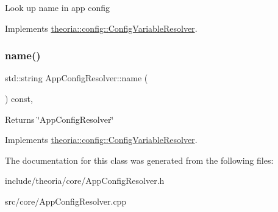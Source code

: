 Look up name in app config 

Implements \hyperlink{classtheoria_1_1config_1_1ConfigVariableResolver}{theoria\+::config\+::\+Config\+Variable\+Resolver}.

\mbox{\label{classtheoria_1_1core_1_1AppConfigResolver_ad7c8c08e622613c6505418774a71abda}} 
\subsubsection{\texorpdfstring{name()}{name()}}
{\footnotesize\ttfamily std\+::string App\+Config\+Resolver\+::name (\begin{DoxyParamCaption}{ }\end{DoxyParamCaption}) const\hspace{0.3cm}{\ttfamily [override]}, {\ttfamily [virtual]}}

Returns \char`\"{}\+App\+Config\+Resolver\char`\"{} 

Implements \hyperlink{classtheoria_1_1config_1_1ConfigVariableResolver_a026bda729faf988eaef334a45ec92303}{theoria\+::config\+::\+Config\+Variable\+Resolver}.



The documentation for this class was generated from the following files\+:\begin{DoxyCompactItemize}
\item 
include/theoria/core/App\+Config\+Resolver.\+h\item 
src/core/App\+Config\+Resolver.\+cpp\end{DoxyCompactItemize}
